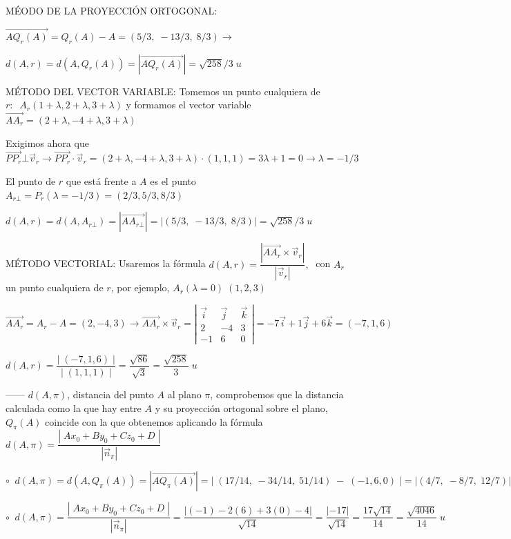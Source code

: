 \noindent MÉODO DE LA PROYECCIÓN ORTOGONAL: 

\noindent $\overrightarrow{ AQ_r(A) } =Q_r(A)-A=(5/3,\;-13/3,\;8/3) \to$ 

\noindent $d(A,r)=d( A,Q_r(A) )= |\overrightarrow{ AQ_r(A) }|=\sqrt{258}/3\; u$

\noindent MÉTODO DEL VECTOR VARIABLE: Tomemos un punto cualquiera de $r:\;\; A_r(1+\lambda,2+\lambda,3+\lambda)$ y formamos el vector variable $\overrightarrow{AA_r}=(2+\lambda,-4+\lambda,3+\lambda)$

\noindent Exigimos ahora que $\overrightarrow{PP_r} \bot \vec v_r \to \overrightarrow{PP_r} \cdot \vec v_r=(2+\lambda,-4+\lambda,3+\lambda)\cdot (1,1,1)=3\lambda+1=0 \to \lambda=-1/3$

\noindent El punto de $r$ que está frente a $A$ es el punto $A_{r\bot}=P_r(\lambda=-1/3)=(2/3,5/3,8/3)$

\noindent $d(A,r)=d(A,A_{r\bot})=|\overrightarrow{AA_{r\bot}}|=|(5/3,\;-13/3,\; 8/3)|=\sqrt{258} /3 \; u$

\noindent 	MÉTODO VECTORIAL: Usaremos la fórmula $d(A,r)=\dfrac{|\overrightarrow{AA_r}\times \vec v_r |}{|\vec v_r|},\;$ con $A_r$ un punto cualquiera de $r$, por ejemplo, $A_r(\lambda=0)\; (1,2,3)$

\noindent $\overrightarrow{AA_r}=A_r-A=(2,-4,3) \to \overrightarrow{AA_r}\times \vec v_r = \left| \begin{matrix} \vec i&\vec j&\vec k \\ 2&-4&3 \\ -1&6&0 \end{matrix} \right|= -7\vec i +1 \vec j +6 \vec k =(-7,1,6)$

\noindent $d(A,r)=\dfrac {|\;(-7,1,6)\;|}{|\;(1,1,1)\;|}=\dfrac {\sqrt{86}}{\sqrt{3}}=\dfrac{\sqrt{258}}{3}\; u$



\noindent ------ $d(A,\pi)$, distancia del punto $A$ al plano $\pi$, comprobemos que la distancia calculada como la que hay entre $A$ y su proyección ortogonal sobre el plano, $Q_{\pi}(A)$ coincide con la que obtenemos aplicando la fórmula $d(A,\pi)=\dfrac{|\;Ax_0+By_0+Cz_0+D\;|}{|\vec n_{\pi}|}$

\noindent $\circ\;\;d(A,\pi)=d(A,Q_{\pi}(A))=|\overrightarrow{AQ_{\pi}(A)}|= |\;(17/14,\; -34/14,\; 51/14)\;-\;(-1,6,0)\;|=|(4/7,\; -8/7,\; 12/7)|=\sqrt{4046}/14\; u$

\noindent $\circ\;\; d(A,\pi)=\dfrac{|\;Ax_0+By_0+Cz_0+D\;|}{|\vec n_{\pi}|}= \dfrac {|(-1)-2(6)+3(0)-4|}{\sqrt{14}}=\dfrac {|-17|}{\sqrt{14}}=\dfrac{17\sqrt{14}}{14}=\dfrac{\sqrt{4046}}{14}\; u$


